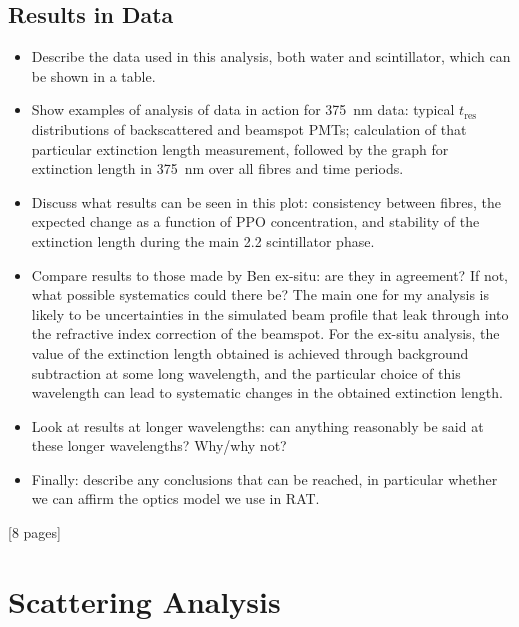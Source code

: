 {\subsection{Results in Data}
\begin{itemize}
    \item Describe the data used in this analysis, both water and scintillator, which can be shown in a table.
    \item Show examples of analysis of data in action for \SI{375}{\nm} data: typical $t_{\textrm{res}}$ distributions of backscattered and beamspot PMTs; calculation of that particular extinction length measurement, followed by the graph for extinction length in \SI{375}{\nm} over all fibres and time periods.
    \item Discuss what results can be seen in this plot: consistency between fibres, the expected change as a function of PPO concentration, and stability of the extinction length during the main \SI{2.2}{\gpl} scintillator phase.
    \item Compare results to those made by Ben ex-situ: are they in agreement? If not, what possible systematics could there be? The main one for my analysis is likely to be uncertainties in the simulated beam profile that leak through into the refractive index correction of the beamspot. For the ex-situ analysis, the value of the extinction length obtained is achieved through background subtraction at some long wavelength, and the particular choice of this wavelength can lead to systematic changes in the obtained extinction length.
    \item Look at results at longer wavelengths: can anything reasonably be said at these longer wavelengths? Why/why not?
    \item Finally: describe any conclusions that can be reached, in particular whether we can affirm the optics model we use in RAT.
\end{itemize}
[8 pages]

\section{Scattering Analysis}
}
